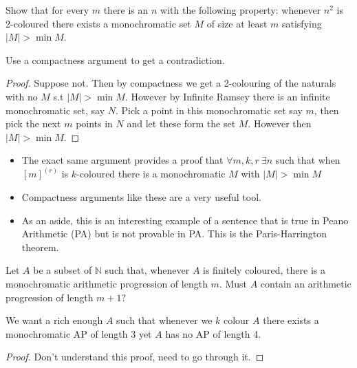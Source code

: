 \documentclass[a4paper]{article}
\begin{document}
	\begin{question}[Question 7]
	Show that for every $m$ there is an $n$ with the following property: whenever ${n}^{2}$ is 2-coloured there exists a monochromatic set $M$ of size at least $m$ satisfying $|M| > \min{M}$.
	\end{question}
	\begin{idea}
	Use a compactness argument to get a contradiction.
	\end{idea}
	\begin{proof}
	Suppose not. Then by compactness we get a 2-colouring of the naturals with no $M$ s.t $|M| > \min M$. However by Infinite Ramsey there is an infinite monochromatic set, say $N$. Pick a point in this monochromatic set say $m$, then pick the next $m$ points in $N$ and let these form the set $M$. However then $|M| > \min M$.
	\end{proof}
	
	\begin{remark}
	\begin{itemize}
	\item The exact same argument provides a proof that $\forall m,k,r \ \exists n$ such that when $[m]^{(r)}$ is $k$-coloured there is a monochromatic $M$ with $|M| > \min M$
	\item Compactness arguments like these are a very useful tool.
	\item As an aside, this is an interesting example of a sentence that is true in Peano Arithmetic (PA) but is not provable in PA. This is the Paris-Harrington theorem.
	\end{itemize}
	\end{remark}
	
	\begin{question}[Question 8]
	Let $A$ be a subset of $\mathbb{N}$ such that, whenever $A$ is finitely coloured, there is a monochromatic arithmetic progression of length $m$. Must $A$ contain an arithmetic progression of length $m+1$?
	\end{question}
	\begin{idea}
	We want a rich enough $A$ such that whenever we $k$ colour $A$ there exists a monochromatic AP of length 3 yet $A$ has no AP of length 4.
	\end{idea}
	\begin{proof}
	Don't understand this proof, need to go through it.
	\end{proof}
	
\end{document}
